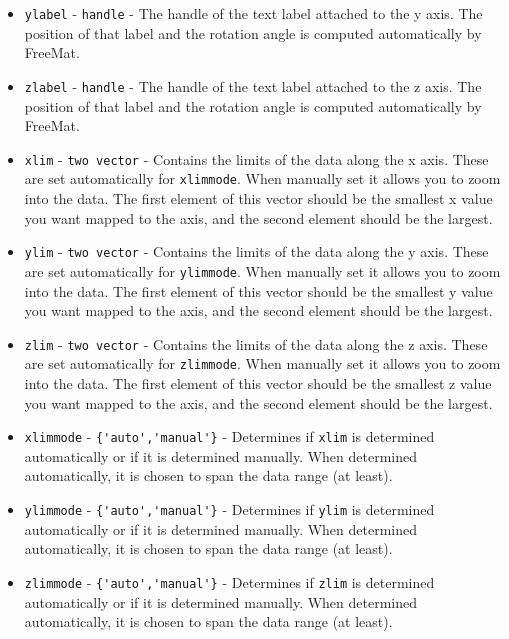 \begin{itemize}
\item  \verb|ylabel| - \verb|handle| - The handle of the text label attached to the y axis.
 The position of that label and the rotation angle is computed automatically by
 FreeMat.

\item  \verb|zlabel| - \verb|handle| - The handle of the text label attached to the z axis.
 The position of that label and the rotation angle is computed automatically by
 FreeMat.

\item  \verb|xlim| - \verb|two vector| - Contains the limits of the data along the x axis.
 These are set automatically for \verb|xlimmode|.  When manually set it allows you to
 zoom into the data.  The first element of this vector should be the smallest x value
 you want mapped to the axis, and the second element should be the largest.

\item  \verb|ylim| - \verb|two vector| - Contains the limits of the data along the y axis.
 These are set automatically for \verb|ylimmode|.  When manually set it allows you to
 zoom into the data.  The first element of this vector should be the smallest y value
 you want mapped to the axis, and the second element should be the largest.

\item  \verb|zlim| - \verb|two vector| - Contains the limits of the data along the z axis.
 These are set automatically for \verb|zlimmode|.  When manually set it allows you to
 zoom into the data.  The first element of this vector should be the smallest z value
 you want mapped to the axis, and the second element should be the largest.

\item  \verb|xlimmode| - \verb|{'auto','manual'}| - Determines if \verb|xlim| is determined
 automatically or if it is determined manually.  When determined automatically, it
 is chosen to span the data range (at least).

\item  \verb|ylimmode| - \verb|{'auto','manual'}| - Determines if \verb|ylim| is determined
 automatically or if it is determined manually.  When determined automatically, it
 is chosen to span the data range (at least).

\item  \verb|zlimmode| - \verb|{'auto','manual'}| - Determines if \verb|zlim| is determined
 automatically or if it is determined manually.  When determined automatically, it
 is chosen to span the data range (at least).


\end{itemize}
